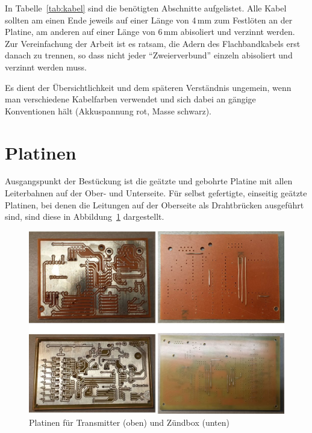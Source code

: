 \documentclass[pdftex, parskip, numbers=noenddot, toc=listof]{scrbook}
\begin{document}
	In Tabelle~\ref{tab:kabel} sind die benötigten Abschnitte aufgelistet. Alle Kabel sollten am einen Ende jeweils auf einer Länge von 4\,mm zum Festlöten an der Platine, am anderen auf einer Länge von 6\,mm abisoliert und verzinnt werden. Zur Vereinfachung der Arbeit ist es ratsam, die Adern des Flachbandkabels erst danach zu trennen, so dass nicht jeder \enquote{Zweierverbund} einzeln abisoliert und verzinnt werden muss.

	Es dient der Übersichtlichkeit und dem späteren Verständnis ungemein, wenn man verschiedene Kabelfarben verwendet und sich dabei an gängige Konventionen hält (Akkuspannung rot, Masse schwarz).

	\section{Platinen}

	Ausgangspunkt der Bestückung ist die geätzte und gebohrte Platine mit allen Leiterbahnen auf der Ober- und Unterseite. Für selbst gefertigte, einseitig geätzte Platinen, bei denen die Leitungen auf der Oberseite als Drahtbrücken ausgeführt sind, sind diese in Abbildung~\ref{fig:platinen} dargestellt.

	\begin{figure}[t]
		\centering
		\includegraphics[width=\textwidth]{bilder/platinen}
		\caption{Platinen für Transmitter (oben) und Zündbox (unten)}
		\label{fig:platinen}
	\end{figure}
\end{document}
